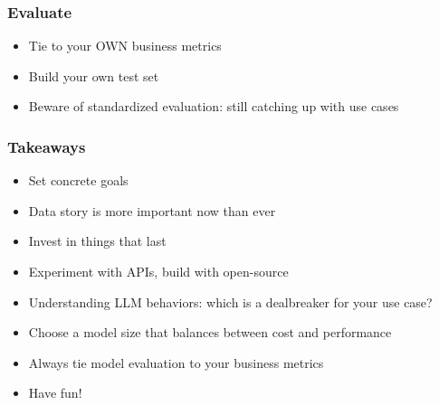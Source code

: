\begin{frame}[fragile]\frametitle{Evaluate}

\begin{itemize}
\item Tie to your OWN business metrics
\item Build your own test set
\item Beware of standardized evaluation: still catching up with use cases
\end{itemize}	

\end{frame}

\begin{frame}[fragile]\frametitle{Takeaways}

\begin{itemize}
\item Set concrete goals
\item Data story is more important now than ever
\item Invest in things that last
\item Experiment with APIs, build with open-source
\item Understanding LLM behaviors: which is a dealbreaker for your use case?
\item Choose a model size that balances between cost and performance
\item Always tie model evaluation to your business metrics
\item Have fun!
\end{itemize}	

\end{frame}